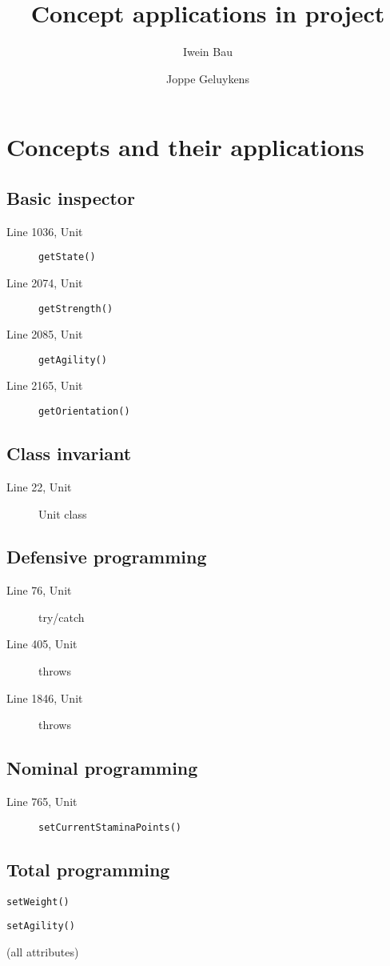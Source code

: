 \documentclass[]{article}
\title{\textbf{Concept applications in project}}
\author{Iwein Bau \and Joppe Geluykens}
\begin{document}
\maketitle

\section{Concepts and their applications}
\subsection{Basic inspector}
	\begin{description}
		\item[Line 1036, Unit] \texttt{getState()}
		\item[Line 2074, Unit] \texttt{getStrength()}
		\item[Line 2085, Unit] \texttt{getAgility()}
		\item[Line 2165, Unit] \texttt{getOrientation()}
	\end{description}
	
\subsection{Class invariant}
	\begin{description}
		\item[Line 22, Unit] Unit class
	\end{description}
	
\subsection{Defensive programming}
	\begin{description}
		\item[Line 76, Unit] try/catch
		\item[Line 405, Unit] throws
		\item[Line 1846, Unit] throws 
	\end{description}
	
\subsection{Nominal programming}
	\begin{description}
		\item[Line 765, Unit] \texttt{setCurrentStaminaPoints()}
	\end{description}
	
\subsection{Total programming}
	\begin{description}
		\item[Line 562, Unit] \texttt{setWeight()}
		\item[Line 601, Unit] \texttt{setAgility()}
		\item (all attributes)
	\end{description}
	
\end{document}
